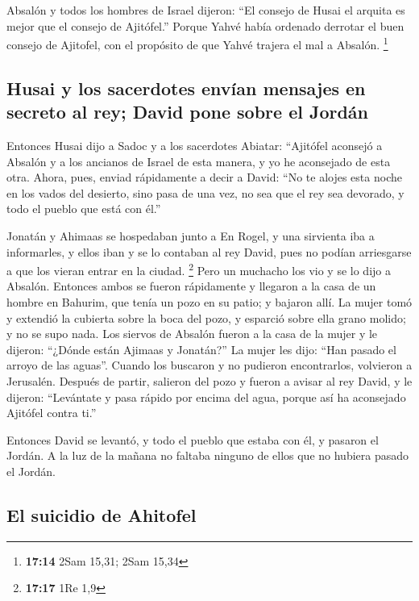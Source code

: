 \begin{paracol}{2}
 Absalón y todos los hombres de Israel dijeron: ``El
consejo de Husai el arquita es mejor que el consejo de Ajitófel.''
Porque Yahvé había ordenado derrotar el buen consejo de Ajitofel, con el
propósito de que Yahvé trajera el mal a Absalón. \footnote{\textbf{17:14}
  2Sam 15,31; 2Sam 15,34}

\hypertarget{husai-y-los-sacerdotes-envuxedan-mensajes-en-secreto-al-rey-david-pone-sobre-el-jorduxe1n}{%
\subsection{Husai y los sacerdotes envían mensajes en secreto al rey;
David pone sobre el
Jordán}\label{husai-y-los-sacerdotes-envuxedan-mensajes-en-secreto-al-rey-david-pone-sobre-el-jorduxe1n}}

 Entonces Husai dijo a Sadoc y a los sacerdotes Abiatar:
``Ajitófel aconsejó a Absalón y a los ancianos de Israel de esta manera,
y yo he aconsejado de esta otra.  Ahora, pues, enviad
rápidamente a decir a David: ``No te alojes esta noche en los vados del
desierto, sino pasa de una vez, no sea que el rey sea devorado, y todo
el pueblo que está con él.''

 Jonatán y Ahimaas se hospedaban junto a En Rogel, y una
sirvienta iba a informarles, y ellos iban y se lo contaban al rey David,
pues no podían arriesgarse a que los vieran entrar en la ciudad.
\footnote{\textbf{17:17} 1Re 1,9}  Pero un muchacho los
vio y se lo dijo a Absalón. Entonces ambos se fueron rápidamente y
llegaron a la casa de un hombre en Bahurim, que tenía un pozo en su
patio; y bajaron allí.  La mujer tomó y extendió la
cubierta sobre la boca del pozo, y esparció sobre ella grano molido; y
no se supo nada.  Los siervos de Absalón fueron a la casa
de la mujer y le dijeron: ``¿Dónde están Ajimaas y Jonatán?'' La mujer
les dijo: ``Han pasado el arroyo de las aguas''. Cuando los buscaron y
no pudieron encontrarlos, volvieron a Jerusalén.  Después
de partir, salieron del pozo y fueron a avisar al rey David, y le
dijeron: ``Levántate y pasa rápido por encima del agua, porque así ha
aconsejado Ajitófel contra ti.''

 Entonces David se levantó, y todo el pueblo que estaba
con él, y pasaron el Jordán. A la luz de la mañana no faltaba ninguno de
ellos que no hubiera pasado el Jordán.

\hypertarget{el-suicidio-de-ahitofel}{%
\subsection{El suicidio de Ahitofel}\label{el-suicidio-de-ahitofel}}


\end{paracol}
